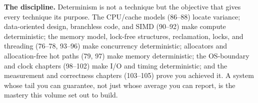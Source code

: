 \textbf{The discipline.} Determinism is not a technique but the objective that gives every technique its purpose. The CPU/cache models (86--88) locate variance; data-oriented design, branchless code, and SIMD (90--92) make compute deterministic; the memory model, lock-free structures, reclamation, locks, and threading (76--78, 93--96) make concurrency deterministic; allocators and allocation-free hot paths (79, 97) make memory deterministic; the OS-boundary and clock chapters (98--102) make I/O and timing deterministic; and the measurement and correctness chapters (103--105) prove you achieved it. A system whose tail you can guarantee, not just whose average you can report, is the mastery this volume set out to build.
